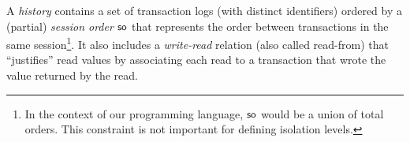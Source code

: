 A \emph{history} contains a set of transaction logs (with distinct identifiers) ordered by a (partial) \emph{session order} $\mathsf{so}$ that represents the order between transactions in the same session\footnote{In the context of our programming language, $\mathsf{so}$ would be a union of total orders. This constraint is not important for defining isolation levels.}. It also includes a
\emph{write-read} relation (also called read-from) that ``justifies'' read values by associating each read to a transaction that wrote the value returned by the read.




%



